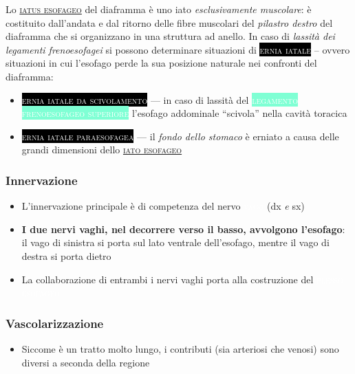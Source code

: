 \documentclass[italian,]{article}
\providecommand{\tightlist}{%
  \setlength{\itemsep}{0pt}\setlength{\parskip}{0pt}}
\newcommand{\tol}[1]{\colorbox{Aquamarine}{\textcolor{white}{\textsc{#1}}}}
\newcommand{\ner}[1]{\colorbox{Dandelion}{\textcolor{white}{\textsc{#1}}}}
\newcommand{\pat}[1]{\colorbox{black}{\textcolor{white}{\textsc{#1}}}}
\renewcommand{\a}[1]{\underline{\textsc{#1}}}
\newcommand{\netter}[1]{ \fbox{\textsf{Netter (2014), tav. #1}} }
\newcommand{\normalbox}[2]{\begin{tcolorbox}[title=#1]#2\end{tcolorbox}} %
\begin{document}
\normalbox{Ernia iatale}{
Lo \a{iatus esofageo} del diaframma è uno iato \emph{esclusivamente muscolare}: è costituito dall'andata e dal ritorno delle fibre muscolari del \emph{pilastro destro} del diaframma che si organizzano in una struttura ad anello. In caso di \emph{lassità dei legamenti frenoesofagei} si possono determinare situazioni di \pat{ernia iatale} -- ovvero situazioni in cui l'esofago perde la sua posizione naturale nei confronti del diaframma: \begin{itemize} \tightlist \item \pat{ernia iatale da scivolamento} --- in caso di lassità del \tol{legamento frenoesofageo superiore} l'esofago addominale ``scivola'' nella cavità toracica \item \pat{ernia iatale paraesofagea} --- il \emph{fondo dello stomaco} è erniato a causa delle grandi dimensioni dello \a{iato esofageo} \end{itemize}
}

\hypertarget{innervazione-3}{%
\subsubsection{Innervazione}\label{innervazione-3}}

\netter{236}

\begin{itemize}
\tightlist
\item
  L'innervazione principale è di competenza del nervo \ner{vago} (dx
  \emph{e} sx)
\item
  \textbf{I due nervi vaghi, nel decorrere verso il basso, avvolgono
  l'esofago}: il vago di sinistra si porta sul lato ventrale
  dell'esofago, mentre il vago di destra si porta dietro
\item
  La collaborazione di entrambi i nervi vaghi porta alla costruzione del
  \ner{plesso esofageo}
\end{itemize}

\hypertarget{vascolarizzazione-2}{%
\subsubsection{Vascolarizzazione}\label{vascolarizzazione-2}}

\begin{itemize}
\tightlist
\item
  Siccome è un tratto molto lungo, i contributi (sia arteriosi che
  venosi) sono diversi a seconda della regione
\end{itemize}
\end{document}
